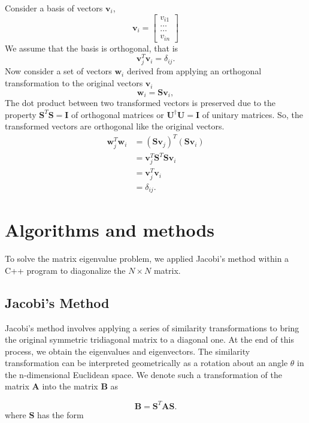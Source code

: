 \documentclass[10pt,showpacs,preprintnumbers,footinbib,amsmath,amssymb,aps,prl,twocolumn,groupedaddress,superscriptaddress,showkeys]{revtex4-1}
\begin{document}
{Consider a basis of vectors $\mathbf{v}_i$,
\[
\mathbf{v}_i = \begin{bmatrix} v_{i1} \\ \dots \\ \dots \\v_{in} \end{bmatrix}
\]
We assume that the basis is orthogonal, that is 
\[
\mathbf{v}_j^T\mathbf{v}_i = \delta_{ij}.
\]
Now consider a set of vectors $\mathbf{w}_i$ derived from applying an orthogonal
transformation to the original vectors $\mathbf{v}_i$
\[
\mathbf{w}_i=\mathbf{S}\mathbf{v}_i,
\]
The dot product between two transformed vectors is preserved due to the
property $\mathbf{S}^T \mathbf{S} = \mathbf{I}$ of orthogonal matrices
or $\mathbf{U} ^\dagger \mathbf{U} = \mathbf{I}$ of unitary matrices.
So, the transformed vectors are orthogonal like the original vectors.
\begin{align*}
\mathbf{w}_j^T\mathbf{w}_i &= (\mathbf{S} \mathbf{v}_j)^T (\mathbf{S}\mathbf{v}_i)\\
	&= \mathbf{v}_j ^T \mathbf{S}^T \mathbf{S} \mathbf{v}_i\\
	&= \mathbf{v}_j ^T \mathbf{v}_i\\
	&= \delta_{ij}.
\end{align*}

\section{Algorithms and methods}

To solve the matrix eigenvalue problem, we applied Jacobi's method within a
C++ program to diagonalize the $N \times N$ matrix.

\subsection{Jacobi's Method}

Jacobi's method involves applying a series of similarity transformations
to bring the original symmetric tridiagonal matrix to a diagonal one. At the end
of this process, we obtain the eigenvalues and eigenvectors. The similarity
transformation can be interpreted geometrically as a rotation
about an angle $\theta$ in the n-dimensional Euclidean space. We denote
such a transformation of the matrix $\mathbf{A}$ into the matrix
$\mathbf{B}$ as

\begin{equation*}
	\mathbf{B} = \mathbf{S} ^T \mathbf{A} \mathbf{S}.
\end{equation*}
where $\mathbf{S}$ has the form

}
\end{document}
